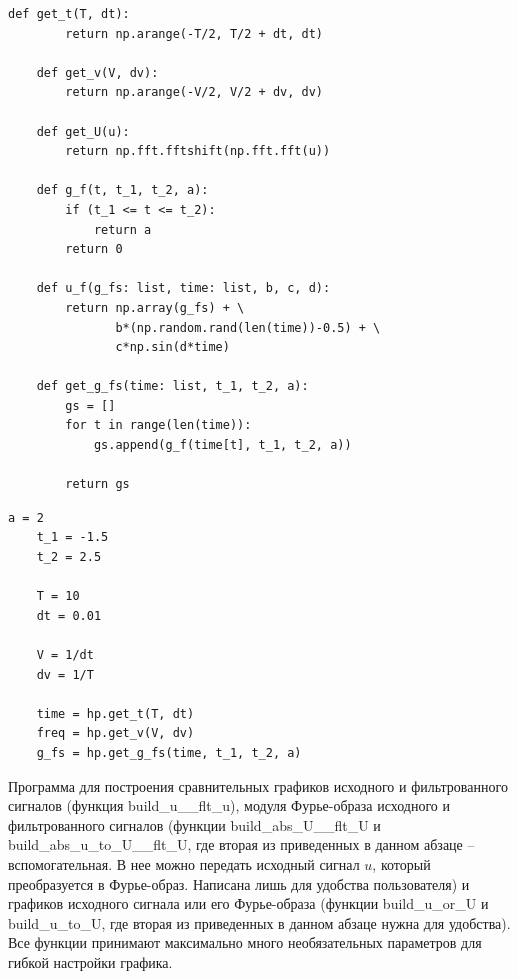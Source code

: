 \documentclass[a4paper, 12pt]{article}
\begin{document}
    \begin{lstlisting}[label=l1, caption={Файл help.py. Вспомогательные функции.}]
    def get_t(T, dt):
        return np.arange(-T/2, T/2 + dt, dt)   
        
    def get_v(V, dv):
        return np.arange(-V/2, V/2 + dv, dv)
          
    def get_U(u):
        return np.fft.fftshift(np.fft.fft(u))
        
    def g_f(t, t_1, t_2, a):
        if (t_1 <= t <= t_2):
            return a
        return 0
        
    def u_f(g_fs: list, time: list, b, c, d):
        return np.array(g_fs) + \
               b*(np.random.rand(len(time))-0.5) + \
               c*np.sin(d*time)
        
    def get_g_fs(time: list, t_1, t_2, a):
        gs = []
        for t in range(len(time)):
            gs.append(g_f(time[t], t_1, t_2, a))
        
        return gs   
    \end{lstlisting}
    \begin{lstlisting}[label=l2, caption={Файл static.py. Вспомогательные переменные.}]
    a = 2
    t_1 = -1.5
    t_2 = 2.5
        
    T = 10
    dt = 0.01
        
    V = 1/dt
    dv = 1/T
        
    time = hp.get_t(T, dt)
    freq = hp.get_v(V, dv)
    g_fs = hp.get_g_fs(time, t_1, t_2, a)
    \end{lstlisting}


    Программа для построения сравнительных графиков исходного и фильтрованного сигналов (функция build\_{u}\_\_{flt}\_{u}), 
    модуля Фурье-образа исходного и фильтрованного сигналов (функции build\_{abs}\_{U}\_\_{flt}\_{U} и build\_{abs}\_{u}\_{to}\_{U}\_\_{flt}\_{U}, 
    где вторая из приведенных в данном абзаце -- вспомогательная. В нее можно передать исходный сигнал $u$, который преобразуется в Фурье-образ.
    Написана лишь для удобства пользователя) и графиков исходного сигнала или его Фурье-образа (функции build\_{u}\_{or}\_{U} и build\_{u}\_{to}\_{U}, 
    где вторая из приведенных в данном абзаце нужна для удобства). Все функции принимают максимально много необязательных параметров для гибкой настройки
    графика.
\end{document}
